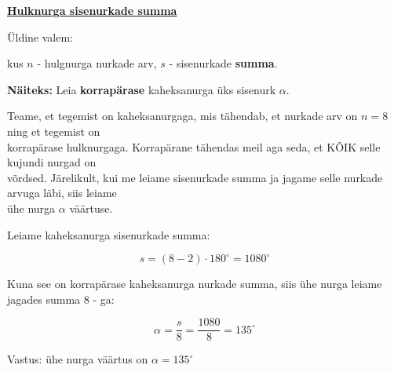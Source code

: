 \begin{center}
{{{\begin{flushleft}
\vspace{5mm}
\hspace{5mm}
\textbf{\underline{Hulknurga sisenurkade summa}}

\vspace{2mm}
\hspace{5mm}
Üldine valem: 

\vspace{2mm}
\hspace{5mm}
kus $n$ - hulgnurga nurkade arv, $s$ - sisenurkade \textbf{summa}.

\vspace{2mm}
\hspace{5mm}
\textbf{Näiteks:} Leia \textbf{korrapärase} kaheksanurga üks sisenurk $\alpha$.

\vspace{2mm}
\hspace{5mm}
Teame, et tegemist on kaheksanurgaga, mis tähendab, et nurkade arv on $n=8$ ning et tegemist on\\ \hspace{5mm} korrapärase hulknurgaga. Korrapärane tähendas meil aga seda, et KÕIK selle kujundi nurgad on\\ \hspace{5mm} võrdsed. Järelikult, kui me leiame sisenurkade summa ja jagame selle nurkade arvuga läbi, siis leiame\\ \hspace{5mm} ühe nurga $\alpha$ väärtuse.

\vspace{2mm}
\hspace{5mm}
Leiame kaheksanurga sisenurkade summa:

\begin{equation}
\label{eq17_1}
s=(8-2)\cdot 180^{\circ} = 1080 ^{\circ}
\end{equation}

\hspace{5mm}
Kuna see on korrapärase kaheksanurga nurkade summa, siis ühe nurga leiame jagades summa 8 - ga:

\begin{equation}
\label{eq17_2}
\alpha = \dfrac{s}{8} = \dfrac{1080}{8} = 135^{\circ}
\end{equation}

\hspace{5mm}
Vastus: ühe nurga väärtus on $ \alpha = 135^{\circ} $

\end{flushleft}
}}}
\end{center}








